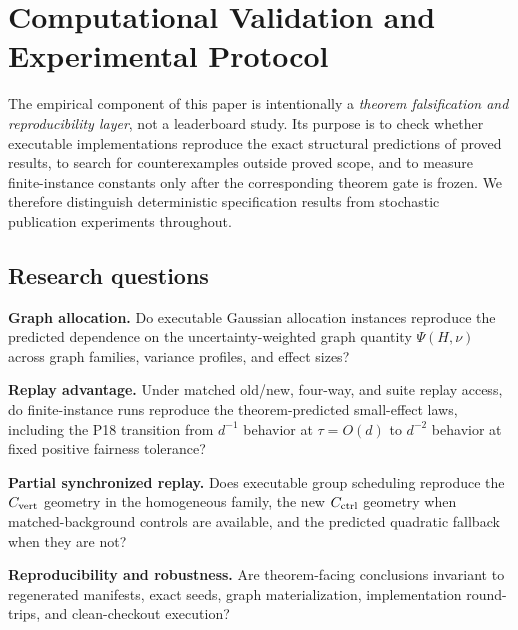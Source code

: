 \section{Computational Validation and Experimental Protocol}
\label{arch:sec:evaluation}

The empirical component of this paper is intentionally a \emph{theorem
falsification and reproducibility layer}, not a leaderboard study. Its purpose
is to check whether executable implementations reproduce the exact structural
predictions of proved results, to search for counterexamples outside proved
scope, and to measure finite-instance constants only after the corresponding
theorem gate is frozen. We therefore distinguish deterministic specification
results from stochastic publication experiments throughout.

\subsection{Research questions}

\begin{description}[leftmargin=1.8cm,labelwidth=1.45cm,style=nextline]
\item[\textbf{RQ1}] \textbf{Graph allocation.}
Do executable Gaussian allocation instances reproduce the predicted dependence
on the uncertainty-weighted graph quantity $\Psi(H,\nu)$ across graph families,
variance profiles, and effect sizes?

\item[\textbf{RQ2}] \textbf{Replay advantage.}
Under matched old/new, four-way, and suite replay access, do finite-instance
runs reproduce the theorem-predicted small-effect laws, including the P18
transition from $d^{-1}$ behavior at $\tau=O(d)$ to $d^{-2}$ behavior at fixed
positive fairness tolerance?

\item[\textbf{RQ3}] \textbf{Partial synchronized replay.}
Does executable group scheduling reproduce the $C_{\rm vert}$ geometry in the
homogeneous family, the new $C_{\rm ctrl}$ geometry when matched-background
controls are available, and the predicted quadratic fallback when they are not?

\item[\textbf{RQ4}] \textbf{Reproducibility and robustness.}
Are theorem-facing conclusions invariant to regenerated manifests, exact seeds,
graph materialization, implementation round-trips, and clean-checkout execution?
\end{description}


